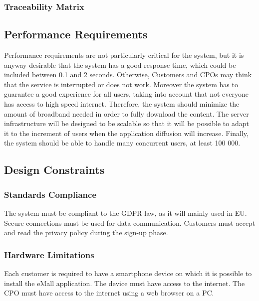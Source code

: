 \subsubsection{Traceability Matrix}
\subsection{Performance Requirements}

Performance requirements are not particularly critical for the system, but it is anyway desirable that the system has a good response time, which could be included between 0.1 and 2 seconds.
Otherwise, Customers and CPOs may think that the service is interrupted or does not work.
Moreover the system has to guarantee a good experience for all users, taking into account that not everyone has access to high speed internet. Therefore,
the system should minimize the amount of broadband needed in order to fully
download the content.
The server infrastructure will be designed to be scalable so that it will be possible to adapt it to
the increment of users when the application diffusion will increase.
Finally, the system should be able to handle many concurrent users, at least
100 000.
\subsection{Design Constraints}
\subsubsection{Standards Compliance}

The system must be compliant to the GDPR law, as it will mainly used in EU. \newline
Secure connections must be used for data communication. \newline
Customers must accept and read the privacy policy during the sign-up phase. \newline

\subsubsection{Hardware Limitations}

Each customer is required to have a smartphone device on which it is possible to install the eMall application. The device must have access to the internet. \newline
The CPO must have access to the internet using a web browser on a PC.  

